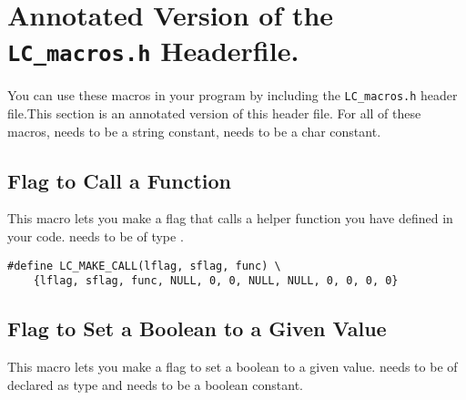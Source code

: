 %
%
%

\section{Annotated Version of the \texttt{LC_macros.h} Headerfile.}

You can use these macros in your program by including the \texttt{LC_macros.h} header file.\footnotemark This section is an annotated version of this header file. For all of these macros,  needs to be a string constant,  needs to be a char constant.


\subsection{Flag to Call a Function}
This macro lets you make a flag that calls a helper function you have defined in your code.  needs to be of type .\footnotemark


\begin{verbatim}
#define LC_MAKE_CALL(lflag, sflag, func) \
	{lflag, sflag, func, NULL, 0, 0, NULL, NULL, 0, 0, 0, 0}
\end{verbatim}

\subsection{Flag to Set a Boolean to a Given Value}
This macro lets you make a flag to set a boolean to a given value.  needs to be of declared as type  and  needs to be a boolean constant.

